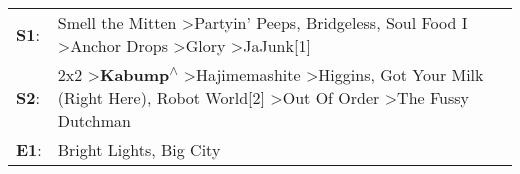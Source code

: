 \begin{supertabular}{p{0.03\textwidth}p{0.92\textwidth}}
 \textbf{S1}:  &                                                                                  Smell the Mitten\textsuperscript{} \textgreater \enspace Partyin' Peeps\textsuperscript{}, \enspace Bridgeless\textsuperscript{}, \enspace Soul Food I\textsuperscript{} \textgreater \enspace Anchor Drops\textsuperscript{} \textgreater \enspace Glory\textsuperscript{} \textgreater \enspace JaJunk[1]\textsuperscript{}  \enspace  \\
 \textbf{S2}:  &  2x2\textsuperscript{} \textgreater \enspace \textbf{Kabump\textsuperscript{$\wedge$}} \textgreater \enspace Hajimemashite\textsuperscript{} \textgreater \enspace Higgins\textsuperscript{}, \enspace Got Your Milk (Right Here)\textsuperscript{}, \enspace Robot World[2]\textsuperscript{} \textgreater \enspace Out Of Order\textsuperscript{} \textgreater \enspace The Fussy Dutchman\textsuperscript{}  \enspace  \\
 \textbf{E1}:  &                                                                                                                                                                                                                                                                                                                                                                      Bright Lights, Big City\textsuperscript{}  \enspace  \\
\end{supertabular}
